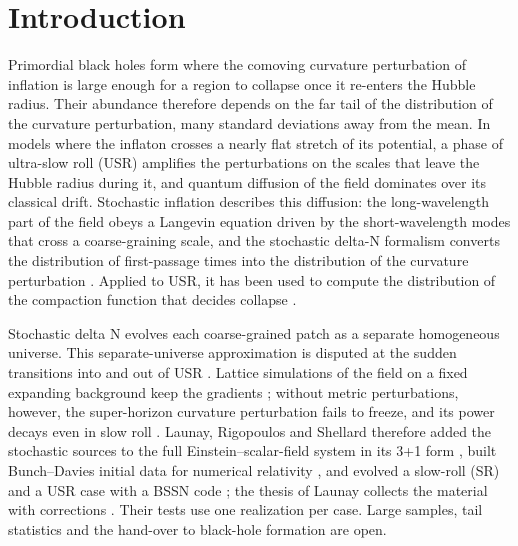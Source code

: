 \documentclass[aps,prd,twocolumn,10pt,superscriptaddress,nofootinbib,longbibliography,floatfix]{revtex4-2}
\begin{document}
\section{Introduction}\label{sec:intro}

Primordial black holes form where the comoving curvature perturbation of inflation is large enough for a region to collapse once it re-enters the Hubble radius. Their abundance therefore depends on the far tail of the distribution of the curvature perturbation, many standard deviations away from the mean. In models where the inflaton crosses a nearly flat stretch of its potential, a phase of ultra-slow roll (USR) amplifies the perturbations on the scales that leave the Hubble radius during it, and quantum diffusion of the field dominates over its classical drift. Stochastic inflation describes this diffusion: the long-wavelength part of the field obeys a Langevin equation driven by the short-wavelength modes that cross a coarse-graining scale, and the stochastic delta-N formalism converts the distribution of first-passage times into the distribution of the curvature perturbation \cite{Fujita:2013alg,Jackson:2022is}. Applied to USR, it has been used to compute the distribution of the compaction function that decides collapse \cite{Raatikainen:2023cf,Raatikainen:2025kicks}.

Stochastic delta N evolves each coarse-grained patch as a separate homogeneous universe. This separate-universe approximation is disputed at the sudden transitions into and out of USR \cite{Jackson:2023su}. Lattice simulations of the field on a fixed expanding background keep the gradients \cite{Caravano:2024usr}; without metric perturbations, however, the super-horizon curvature perturbation fails to freeze, and its power decays even in slow roll \cite{Barker:2026lattice}. Launay, Rigopoulos and Shellard therefore added the stochastic sources to the full Einstein--scalar-field system in its 3+1 form \cite{Launay:2024sigr}, built Bunch--Davies initial data for numerical relativity \cite{Launay:2025bd}, and evolved a slow-roll (SR) and a USR case with a BSSN code \cite{Launay:2025sinr}; the thesis of Launay collects the material with corrections \cite{Launay:2026thesis}. Their tests use one realization per case. Large samples, tail statistics and the hand-over to black-hole formation are open.
\end{document}
